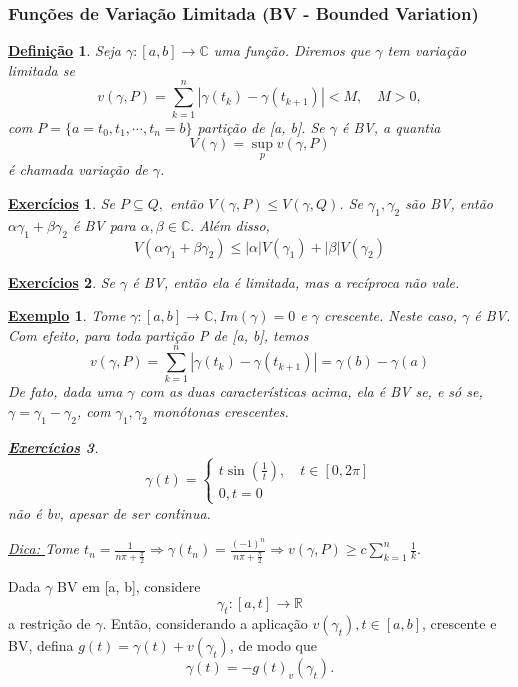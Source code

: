 \documentclass{article}
\newtheorem*{def*}{\underline{Defini\c c\~ao}}
\newtheorem{example}{\underline{Exemplo}}[section]
\newtheorem*{exer*}{\underline{Exerc\'icios}}
\begin{document}
  \subsubsection{Fun\c c\~oes de Varia\c c\~ao Limitada (BV - Bounded Variation)}
  \begin{def*}
    Seja $\gamma:[a, b]\rightarrow \mathbb{C}$ uma fun\c c\~ao. Diremos que $\gamma$ tem varia\c c\~ao limitada se 
    $$
    v(\gamma, P) = \sum\limits_{k=1}^{n}|\gamma(t_{k}) - \gamma(t_{k+1})| < M, \quad M > 0,
    $$
    com $P = \{a=t_{0}, t_1, \cdots, t_n = b\} $ parti\c c\~ao de [a, b]. Se $\gamma$ \'e BV, a quantia
    $$
    V(\gamma) = \sup_p v(\gamma, P)
    $$
    \'e chamada varia\c c\~ao de $\gamma$.
  \end{def*}
  \begin{exer*}
    Se $P\subseteq{Q}, $ ent\~ao $V(\gamma, P)\leq{V(\gamma, Q)}$. Se $\gamma_1, \gamma_2$ s\~ao BV, ent\~ao $\alpha \gamma_1 + \beta \gamma_2$
    \'e BV para $\alpha, \beta\in \mathbb{C}.$ Al\'em disso, 
    $$
    V(\alpha \gamma_1 + \beta \gamma_2) \leq |\alpha|V(\gamma_1) + |\beta|V(\gamma_2)
    $$
  \end{exer*}
  \begin{exer*}
    Se $\gamma$ \'e BV, ent\~ao ela \'e limitada, mas a rec\'iproca n\~ao vale.
  \end{exer*}
  \begin{example}
    Tome $\gamma:[a, b]\rightarrow \mathbb{C}, Im(\gamma) = 0$ e $\gamma$ crescente. Neste caso, $\gamma$ \'e BV. Com efeito, para
    toda parti\c c\~ao P de [a, b], temos 
    $$
    v(\gamma, P) = \sum\limits_{k=1}^{n}|\gamma(t_{k}) - \gamma(t_{k+1})| = \gamma(b) - \gamma(a)
    $$
    De fato, dada uma $\gamma$ com as duas caracter\'isticas acima, ela \'e BV se, e s\'o se, $\gamma = \gamma_1 - \gamma_2$, com
    $\gamma_1, \gamma_2$ mon\'otonas crescentes.
    \begin{exer*}
      $$
      \gamma(t) = \left\{\begin{array}{ll}
          t\sin{(\frac{1}{t})}, \quad t\in[0, 2\pi] \\
          0, t= 0
      \end{array}\right.
      $$
      n\~ao \'e bv, apesar de ser con\'tinua.

      \underline{Dica: } Tome $t_{n} =\displaystyle \frac{1}{n\pi + \frac{\pi}{2}}\Rightarrow \gamma(t_{n}) =\displaystyle \frac{(-1)^n}{n\pi + \frac{\pi}{2}}\Rightarrow
      v(\gamma, P) \geq c \sum\limits_{k=1}^{n}\frac{1}{k}.$
    \end{exer*}
  \end{example}
  Dada $\gamma$ BV em [a, b], considere 
  $$
  \gamma_t:[a, t]\rightarrow \mathbb{R}
  $$
  a restri\c c\~ao de $\gamma.$ Ent\~ao, considerando a aplica\c c\~ao $v(\gamma_t), t\in[a, b]$, crescente e BV, defina $
  g(t) = \gamma(t) + v(\gamma_t)$, de modo que
  $$
  \gamma(t) = -g(t) _ v(\gamma_t).
  $$
  \newpage
\end{document}
